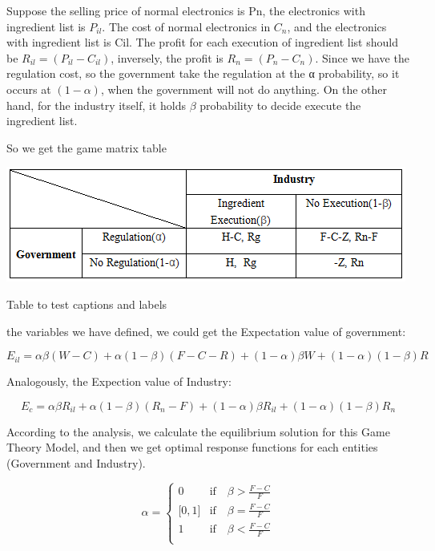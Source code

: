 Suppose the selling price of normal electronics is Pn, the electronics with ingredient list is $P_{il}$. 
The cost of normal electronics in $C_n$, and the electronics with ingredient list is Cil. 
The profit for each execution of ingredient list should be $R_{il} = (P_{il}-C_{il})$, inversely, 
the profit is $R_n = (P_n-C_n)$. Since we have the regulation cost, 
so the government take the regulation at the α probability, so it occurs at $(1-\alpha)$, 
when the government will not do anything. On the other hand, for the industry itself, 
it holds $\beta$ probability to decide execute the ingredient list.

So we get the game matrix table

\begin{center}
\begin{table}[!htbp]
\includegraphics[width=0.5\columnwidth]{figure/result.png}
\label{table:2}
\caption{Table to test captions and labels}
\end{table}
\end{center}

the variables we have defined, we could get the Expectation value of government:

\[
E_{il} = \alpha\beta(W-C) + \alpha(1-\beta)(F-C-R) + (1-\alpha)\beta W + (1-\alpha)(1-\beta)R
\]

Analogously, the Expection value of Industry:

\[
E_c = \alpha\beta R_{il} + \alpha(1-\beta)(R_n-F) + (1-\alpha)\beta R_{il} + (1-\alpha)(1-\beta)R_n
\]

According to the \cite{chenlihong} analysis, we calculate the equilibrium solution for this Game Theory Model, 
and then we get optimal response functions for each entities (Government and Industry).

\begin{equation}
\alpha = \left\{
\begin{array}{ll}
0 & \text{if} \quad \beta > \frac{F-C}{F} \\
\lbrack 0, 1 \rbrack & \text{if} \quad \beta = \frac{F-C}{F} \\
1 & \text{if} \quad \beta < \frac{F-C}{F} \\
\end{array}
\right.
\end{equation}

